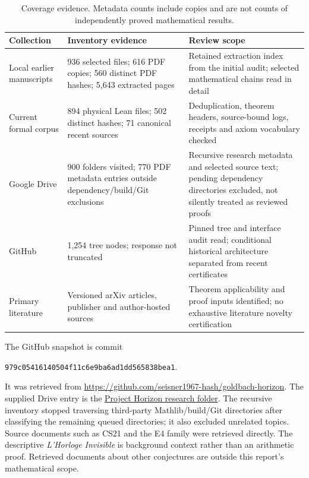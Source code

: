 \documentclass[11pt,a4paper]{article}
\theoremstyle{definition}
\theoremstyle{remark}
\begin{document}
\begin{table}[htbp]\centering\small
\begin{tabularx}{\textwidth}{@{}P{.23\textwidth}P{.24\textwidth}X@{}}\toprule
Collection & Inventory evidence & Review scope\\\midrule
Local earlier manuscripts & 936 selected files; 616 PDF copies; 560 distinct PDF hashes; 5,643 extracted pages & Retained extraction index from the initial audit; selected mathematical chains read in detail\\
Current formal corpus & 894 physical Lean files; 502 distinct hashes; 71 canonical recent sources & Deduplication, theorem headers, source-bound logs, receipts and axiom vocabulary checked\\
Google Drive & 900 folders visited; 770 PDF metadata entries outside dependency/build/Git exclusions & Recursive research metadata and selected source text; pending dependency directories excluded, not silently treated as reviewed proofs\\
GitHub & 1,254 tree nodes; response not truncated & Pinned tree and interface audit read; conditional historical architecture separated from recent certificates\\
Primary literature & Versioned arXiv articles, publisher and author-hosted sources & Theorem applicability and proof inputs identified; no exhaustive literature novelty certification\\\bottomrule
\end{tabularx}
\caption{Coverage evidence. Metadata counts include copies and are not counts of independently proved mathematical results.}\label{tab:corpus}
\end{table}

The GitHub snapshot is commit
\begin{center}\small\nolinkurl{979c05416140504f11c6e9ba6ad1dd565838bea1}.\end{center}
It was retrieved from \url{https://github.com/seisner1967-hash/goldbach-horizon}. The supplied Drive entry is the
\href{https://drive.google.com/drive/folders/1QOC1q-F6ITUfc6mmh81q3fvOHm37fYDF}{Project Horizon research folder}.
The recursive inventory stopped traversing third-party Mathlib/build/Git directories after classifying the remaining queued directories; it also excluded unrelated topics. Source documents such as CS21 and the E4 family were retrieved directly. The descriptive \emph{L'Horloge Invisible} is background context rather than an arithmetic proof. Retrieved documents about other conjectures are outside this report's mathematical scope.
\end{document}
